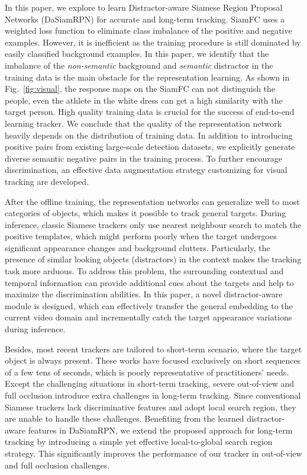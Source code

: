 \documentclass[runningheads]{llncs}
\begin{document}
In this paper, we explore to learn Distractor-aware Siamese Region Proposal Networks (DaSiamRPN) for accurate and long-term tracking. SiamFC uses a weighted loss function to eliminate class imbalance of the positive and negative examples. However, it is inefficient as the training procedure is still dominated by easily classified background examples. In this paper, we identify that the imbalance of the \textit{non-semantic} background and \textit{semantic} distractor in the training data is the main obstacle for the representation learning. As shown in Fig.~\ref{fig:visual}, the response maps on the SiamFC can not distinguish the people, even the athlete in the white dress can get a high similarity with the target person. High quality training data is crucial for the success of end-to-end learning tracker. We conclude that the quality of the representation network heavily depends on the distribution of training data. In addition to introducing positive pairs from existing large-scale detection datasets, we explicitly generate diverse semantic negative pairs in the training process. To further encourage discrimination, an effective data augmentation strategy customizing for visual tracking are developed.

After the offline training, the representation networks can generalize well to most categories of objects, which makes it possible to track general targets.
During inference, classic Siamese trackers only use nearest neighbour search to match the positive templates, which might perform poorly when the target undergoes significant appearance changes and background clutters.
Particularly, the presence of similar looking objects (distractors) in the context makes the tracking task more arduous.
To address this problem, the surrounding contextual and temporal information can provide additional cues about the targets and help to maximize the discrimination abilities.
In this paper, a novel distractor-aware module is designed, which can effectively transfer the general embedding to the current video domain and incrementally catch the target appearance variations during inference.


Besides, most recent trackers are tailored to short-term scenario, where the target object is always present.
These works have focused exclusively on short sequences of a few tens of seconds, which is poorly representative of practitioners' needs.
Except the challenging situations in short-term tracking, severe out-of-view and full occlusion introduce extra challenges in long-term tracking.
Since conventional Siamese trackers lack discriminative features and adopt local search region, they are unable to handle these challenges. Benefiting from the learned distractor-aware features in DaSiamRPN, we extend the proposed approach for long-term tracking by introducing a simple yet effective local-to-global search region strategy. This significantly improves the performance of our tracker in out-of-view and full occlusion challenges.
\end{document}
